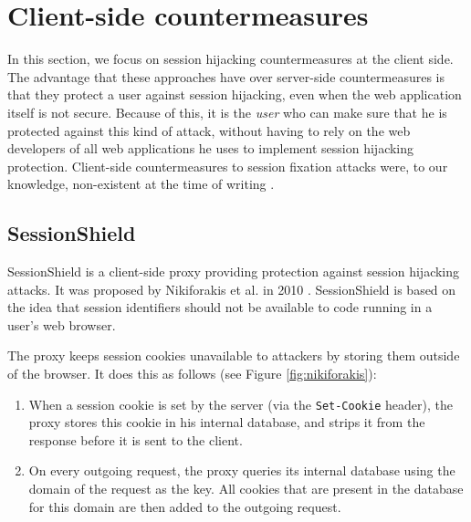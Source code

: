 \section{Client-side countermeasures}

In this section, we focus on session hijacking countermeasures at the client side. The advantage that these approaches have over server-side countermeasures is that they protect a user against session hijacking, even when the web application itself is not secure. Because of this, it is the \emph{user} who can make sure that he is protected against this kind of attack, without having to rely on the web developers of all web applications he uses to implement session hijacking protection. Client-side countermeasures to session fixation attacks were, to our knowledge, non-existent at the time of writing \cite{Bonne2011}.

\subsection{SessionShield}\label{sessionshield}

SessionShield is a client-side proxy providing protection against session hijacking attacks. It was proposed by Nikiforakis et al. in 2010 \cite{Nikiforakis2010}. SessionShield is based on the idea that session identifiers should not be available to code running in a user's web browser.

The proxy keeps session cookies unavailable to attackers by storing them outside of the browser. It does this as follows (see Figure \ref{fig:nikiforakis}):
\begin{enumerate}
	\item When a session cookie is set by the server (via the \texttt{Set-Cookie} header), the proxy stores this cookie in his internal database, and strips it from the response before it is sent to the client.
	\item On every outgoing request, the proxy queries its internal database using the domain of the request as the key. All cookies that are present in the database for this domain are then added to the outgoing request.
\end{enumerate}

